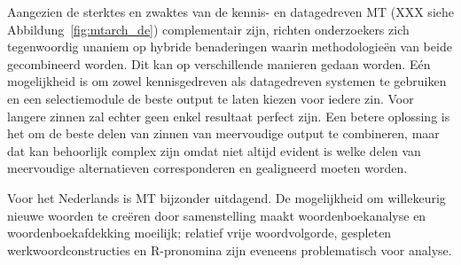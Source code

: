 \documentclass[]{../../metanetpaper}
\begin{document}
\begin{multicols}{2}
    Aangezien de sterktes en zwaktes van de kennis- en datagedreven MT (XXX siehe Abbildung~\ref{fig:mtarch_de}) complementair zijn, richten onderzoekers zich tegenwoordig unaniem op hybride benaderingen waarin methodologie{\"e}n van beide gecombineerd worden. Dit kan op verschillende manieren gedaan worden. E{\'e}n mogelijkheid is om zowel kennisgedreven als datagedreven systemen te gebruiken en een selectiemodule de beste output te laten kiezen voor iedere zin. Voor langere zinnen zal echter geen enkel resultaat perfect zijn. Een betere oplossing is het om de beste delen van zinnen van meervoudige output te combineren, maar dat kan behoorlijk complex zijn omdat niet altijd evident is welke delen van meervoudige alternatieven corresponderen en gealigneerd moeten worden.


Voor het Nederlands is MT bijzonder uitdagend. De mogelijkheid om willekeurig nieuwe woorden te cre{\"e}ren door samenstelling maakt woordenboekanalyse en woordenboekafdekking moeilijk; relatief vrije woordvolgorde, gespleten werkwoordconstructies en R-pronomina zijn eveneens problematisch voor analyse.


\end{multicols}
\end{document}
